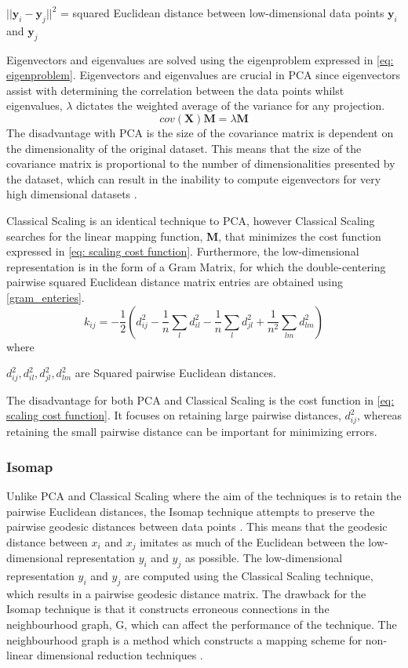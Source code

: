 \documentclass[11pt]{article}
\begin{document}
	$||\textbf{y}_i - \textbf{y}_j ||^{2}$ = squared Euclidean distance between low-dimensional data points $\textbf{y}_i$ and $\textbf{y}_j$
	
	Eigenvectors and eigenvalues are solved using the eigenproblem expressed in \eqref{eq: eigenproblem}. Eigenvectors and eigenvalues are crucial in PCA since eigenvectors assist with determining the correlation between the data points whilst eigenvalues, $\lambda$ dictates the weighted average of the variance for any projection.
	\begin{equation}
	cov(\textbf{X})\textbf{M} = \lambda\textbf{M}
	\label{eq: eigenproblem}
	\end{equation}
	The disadvantage with PCA is the size of the covariance matrix is dependent on the dimensionality of the original dataset. This means that the size of the covariance matrix is proportional to the number of dimensionalities presented by the dataset, which can result in the inability to compute eigenvectors for very high dimensional datasets \cite{van2009dimensionality}.
	
	Classical Scaling is an identical technique to PCA, however Classical Scaling searches for the linear mapping function, \textbf{M}, that minimizes the cost function expressed in \eqref{eq: scaling cost function}. Furthermore, the low-dimensional representation is in the form of a Gram Matrix, for which the double-centering pairwise squared Euclidean distance matrix entries are obtained using \eqref{gram_enteries}.
	\begin{equation}
	k_{ij} = -\frac{1}{2}(d_{ij}^{2}-\frac{1}{n}\sum_{l}d_{il}^{2} - \frac{1}{n}\sum_{l}d_{jl}^{2} + \frac{1}{n^2}\sum_{lm}d_{lm}^{2})
	\label{gram_enteries}
	\end{equation}
	where 

	$d_{ij}^2, d_{il}^2, d_{jl}^2, d_{lm}^2$ are Squared pairwise Euclidean distances.
	
	The disadvantage for both PCA and Classical Scaling is the cost function in \eqref{eq: scaling cost function}. It focuses on retaining large pairwise distances, $d_{ij}^2$, whereas retaining the small pairwise distance can be important for minimizing errors.
	
	\subsubsection{Isomap}
	Unlike PCA and Classical Scaling where the aim of the techniques is to retain the pairwise Euclidean distances, the Isomap technique attempts to preserve the pairwise geodesic distances between data points \cite{Zhang2012}. This means that the geodesic distance between $x_i$ and $x_j$ imitates as much of the Euclidean between the low-dimensional representation $y_i$ and $y_j$ as possible. The low-dimensional representation $y_i$ and $y_j$ are computed using the Classical Scaling technique, which results in a pairwise geodesic distance matrix. The drawback for the Isomap technique is that it constructs erroneous connections in the neighbourhood graph, G, which can affect the performance of the technique. The neighbourhood graph is a method which constructs a mapping scheme for non-linear dimensional reduction techniques \cite{Aeini2014}.
	
\end{document}
